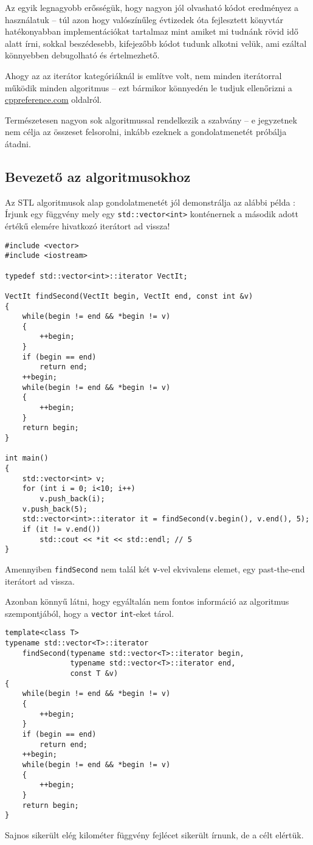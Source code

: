 \documentclass[../cpp_book/cpp_book.tex]{subfiles}
\begin{document}
	Az egyik legnagyobb erősségük, hogy nagyon jól olvasható kódot eredményez a használatuk -- túl azon hogy valószínűleg évtizedek óta fejlesztett könyvtár hatékonyabban implementációkat tartalmaz mint amiket mi tudnánk rövid idő alatt írni, sokkal beszédesebb, kifejezőbb kódot tudunk alkotni velük, ami ezáltal könnyebben debugolható és értelmezhető.
	
	Ahogy az az iterátor kategóriáknál is említve volt, nem minden iterátorral működik minden algoritmus -- ezt bármikor könnyedén le tudjuk ellenőrizni a \url{cppreference.com} oldalról.
	\begin{note}
		Természetesen nagyon sok algoritmussal rendelkezik a szabvány -- e jegyzetnek nem célja az összeset felsorolni, inkább ezeknek a gondolatmenetét próbálja átadni.
	\end{note}
	\subsection{Bevezető az algoritmusokhoz}
	
	Az STL algoritmusok alap gondolatmenetét jól demonstrálja az alábbi példa : Írjunk egy függvény mely egy \texttt{std::vector<int>} konténernek a második adott értékű elemére hivatkozó iterátort ad vissza!
	\begin{lstlisting}
#include <vector>
#include <iostream>

typedef std::vector<int>::iterator VectIt;

VectIt findSecond(VectIt begin, VectIt end, const int &v)
{
	while(begin != end && *begin != v)
	{
		++begin;
	}
	if (begin == end)
		return end;
	++begin;
	while(begin != end && *begin != v)
	{
		++begin;
	}
	return begin;
}

int main()
{
	std::vector<int> v;
	for (int i = 0; i<10; i++)
		v.push_back(i);
	v.push_back(5);
	std::vector<int>::iterator it = findSecond(v.begin(), v.end(), 5);
	if (it != v.end())
		std::cout << *it << std::endl; // 5
}
	\end{lstlisting}
	Amennyiben \texttt{findSecond} nem talál két \texttt{v}-vel ekvivalens elemet, egy past-the-end iterátort ad vissza.
	
	\smallskip
	Azonban könnyű látni, hogy egyáltalán nem fontos információ az algoritmus szempontjából, hogy a \texttt{vector} \texttt{int}-eket tárol.
	\begin{lstlisting}
template<class T>
typename std::vector<T>::iterator 
	findSecond(typename std::vector<T>::iterator begin, 
			   typename std::vector<T>::iterator end, 
			   const T &v)
{
	while(begin != end && *begin != v)
	{
		++begin;
	}
	if (begin == end)
		return end;
	++begin;
	while(begin != end && *begin != v)
	{
		++begin;
	}
	return begin;
}
	\end{lstlisting}
	Sajnos sikerült elég kilométer függvény fejlécet sikerült írnunk, de a célt elértük.
	
\end{document}
